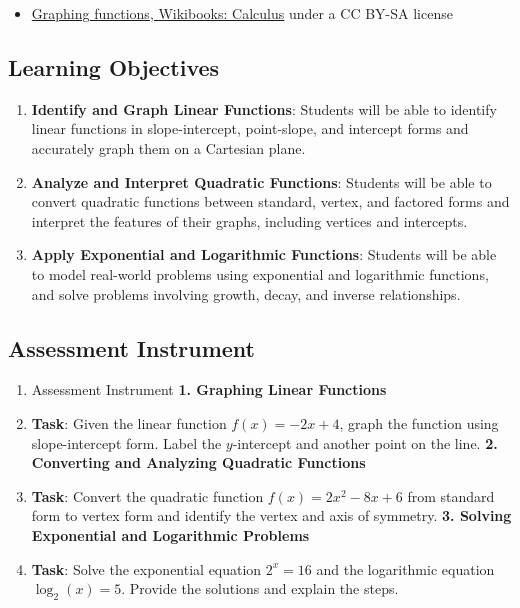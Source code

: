 \begin{itemize}
    \item \href{https://en.wikibooks.org/wiki/Calculus/Graphing_functions}{Graphing functions, Wikibooks: Calculus} under a CC BY-SA license
\end{itemize}

\subsection{Learning Objectives}

\begin{enumerate}
    \item \textbf{Identify and Graph Linear Functions}: Students will be able to identify linear functions in slope-intercept, point-slope, and intercept forms and accurately graph them on a Cartesian plane.
    \item \textbf{Analyze and Interpret Quadratic Functions}: Students will be able to convert quadratic functions between standard, vertex, and factored forms and interpret the features of their graphs, including vertices and intercepts.
    \item \textbf{Apply Exponential and Logarithmic Functions}: Students will be able to model real-world problems using exponential and logarithmic functions, and solve problems involving growth, decay, and inverse relationships.
\end{enumerate}

\subsection{Assessment Instrument}

\begin{enumerate}
    \item Assessment Instrument \textbf{1. Graphing Linear Functions}
    \item \textbf{Task}: Given the linear function $f(x) = -2x + 4$, graph the function using slope-intercept form. Label the $y$-intercept and another point on the line. \textbf{2. Converting and Analyzing Quadratic Functions}
    \item \textbf{Task}: Convert the quadratic function $f(x) = 2x^2 - 8x + 6$ from standard form to vertex form and identify the vertex and axis of symmetry. \textbf{3. Solving Exponential and Logarithmic Problems}
    \item \textbf{Task}: Solve the exponential equation $2^x = 16$ and the logarithmic equation $\log_2(x) = 5$. Provide the solutions and explain the steps.
\end{enumerate}

